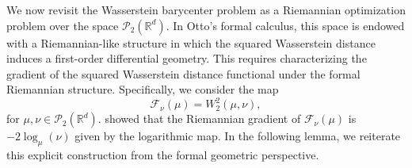 \documentclass[11pt]{article}
\newcommand{\bbR}{\mathbb{R}}
\newcommand{\calF}{\mathcal{F}}
\newcommand{\calP}{\mathcal{P}}
\begin{document}
We now revisit the Wasserstein barycenter problem as a Riemannian optimization problem over the space $\calP_2(\bbR^d)$. In Otto's formal calculus, this space is endowed with a Riemannian-like structure in which the squared Wasserstein distance induces a first-order differential geometry. This requires characterizing the gradient of the squared Wasserstein distance functional under the formal Riemannian structure. Specifically, we consider the map 
\begin{equation}
    \calF_\nu(\mu) = W_2^2(\mu,\nu),
\end{equation}
for $\mu, \nu \in \calP_2(\bbR^d)$. \cite{zemel_2019_FrechetMeansProcrustes} showed that the Riemannian gradient of $\calF_\nu(\mu)$ is $-2\log_{\mu}(\nu)$ given by the logarithmic map. In the following lemma, we reiterate this explicit construction from the formal geometric perspective.
\end{document}
